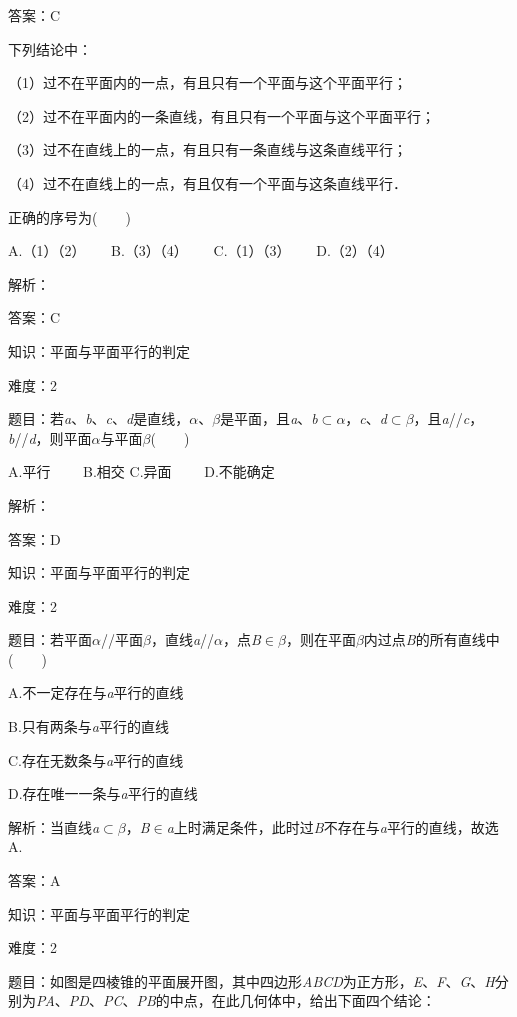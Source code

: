 \documentclass{article} %
\begin{document}
答案：C

下列结论中：

（1）过不在平面内的一点，有且只有一个平面与这个平面平行；

（2）过不在平面内的一条直线，有且只有一个平面与这个平面平行；

（3）过不在直线上的一点，有且只有一条直线与这条直线平行；

（4）过不在直线上的一点，有且仅有一个平面与这条直线平行．

正确的序号为(　　)

A.（1）（2）　　 B.（3）（4）　　 C.（1）（3）　　 D.（2）（4）

解析：

答案：C

知识：平面与平面平行的判定

难度：2

题目：若\textit{a}、\textit{b}、\textit{c}、\textit{d}是直线，\textit{$\alpha$}、\textit{$\beta$}是平面，且\textit{a}、\textit{b}$\mathrm{\subset }$\textit{$\alpha$}，\textit{c}、\textit{d}$\mathrm{\subset }$\textit{$\beta$}，且\textit{a}//\textit{c}，\textit{b}//\textit{d}，则平面\textit{$\alpha$}与平面\textit{$\beta$}(　　)

A.平行　　 B.相交 C.异面　　 D.不能确定

解析：

答案：D

知识：平面与平面平行的判定

难度：2

题目：若平面\textit{$\alpha$}//平面\textit{$\beta$}，直线\textit{a}//\textit{$\alpha$}，点\textit{B}$\mathrm{\in}$\textit{$\beta$}，则在平面\textit{$\beta$}内过点\textit{B}的所有直线中(　　)

A.不一定存在与\textit{a}平行的直线

B.只有两条与\textit{a}平行的直线

C.存在无数条与\textit{a}平行的直线

D.存在唯一一条与\textit{a}平行的直线

解析：当直线\textit{a}$\mathrm{\subset }$\textit{$\beta$}，\textit{B}$\mathrm{\in}$\textit{a}上时满足条件，此时过\textit{B}不存在与\textit{a}平行的直线，故选A.

答案：A

知识：平面与平面平行的判定

难度：2

题目：如图是四棱锥的平面展开图，其中四边形\textit{ABCD}为正方形，\textit{E}、\textit{F}、\textit{G}、\textit{H}分别为\textit{PA}、\textit{PD}、\textit{PC}、\textit{PB}的中点，在此几何体中，给出下面四个结论：
\end{document}
